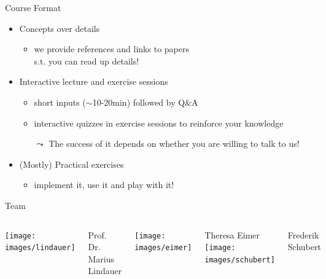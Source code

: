 \documentclass[aspectratio=169]{../latex_main/tntbeamer}  %
\begin{document}
\begin{frame}[c]{Course Format}
	
	\begin{itemize}
		\item Concepts over details
		\begin{itemize}
			\item we provide references and links to papers\\ s.t. you can read up details!
		\end{itemize}
		\smallskip
		\item Interactive lecture and exercise sessions
		\begin{itemize}
			\item short inputs ($\sim$10-20min) followed by Q\&A
			\item interactive quizzes in exercise sessions to reinforce your knowledge
			\item[$\leadsto$] The success of it depends on whether you are willing to talk to us! 
		\end{itemize}
		\smallskip
		\item (Mostly) Practical exercises
		\begin{itemize}
			\item implement it, use it and play with it!
		\end{itemize}
	\end{itemize}
	
\end{frame}
\begin{frame}[c]{Team}
	
	\begin{columns}[T]
		
		\centering
		\texttt{[image: images/lindauer]}
		
		Prof. Dr.\\ Marius Lindauer
		
		\centering
		\texttt{[image: images/eimer]}
		
		Theresa Eimer\\
		
		\centering
		\texttt{[image: images/schubert]}
		
		Frederik Schubert \\
		
		
	\end{columns}
	
	
\end{frame}
\end{document}
